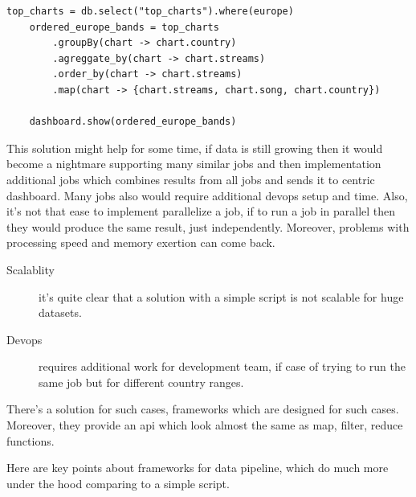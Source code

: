 \begin{lstlisting}[label={lst:chart_list_2}]
    top_charts = db.select("top_charts").where(europe)
    ordered_europe_bands = top_charts
        .groupBy(chart -> chart.country)
        .agreggate_by(chart -> chart.streams)
        .order_by(chart -> chart.streams)
        .map(chart -> {chart.streams, chart.song, chart.country})

    dashboard.show(ordered_europe_bands)
\end{lstlisting}

This solution might help for some time, if data is still growing then
it would become a nightmare supporting many similar jobs and
then implementation additional jobs which combines results from all jobs
and sends it to centric dashboard.
Many jobs also would require additional devops setup and time.
Also, it's not that ease to implement parallelize a job, if to run a job in parallel
then they would produce the same result, just independently.
Moreover, problems with processing speed and memory exertion can come back.

\begin{description}
    \item[Scalablity] it's quite clear that a solution with a simple script is not scalable
    for huge datasets.
    \item[Devops] requires additional work for development team, if case of trying to run
    the same job but for different country ranges.
\end{description}

There's a solution for such cases, frameworks which are designed for such cases.
Moreover, they provide an api which
look almost the same as map, filter, reduce functions.

Here are key points about frameworks for data pipeline, which do much more under
the hood comparing to a simple script.

